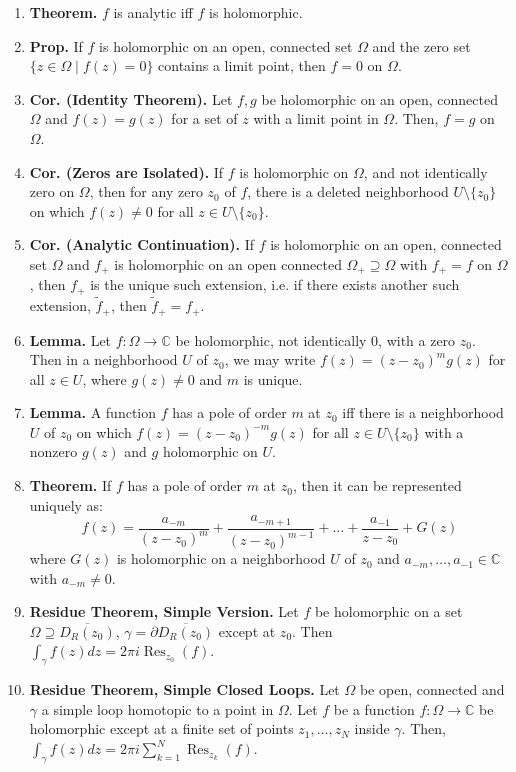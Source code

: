 \documentclass[10pt]{article}
\theoremstyle{definition}
\theoremstyle{named}
\DeclareMathOperator{\Res}{Res}
\begin{document}
\begin{enumerate}
    \item \textbf{Theorem. } $f$ is analytic iff $f$ is holomorphic. 
    \item \textbf{Prop. } If $f$ is holomorphic on an open, connected set $\Omega$ and the zero set $\{z \in \Omega \mid f(z) = 0\}$ contains a limit point, then $f=0$ on $\Omega$. 
    \item \textbf{Cor. (Identity Theorem). } Let $f,g$ be holomorphic on an open, connected $\Omega$ and $f(z)=g(z)$ for a set of $z$ with a limit point in $\Omega$. Then, $f=g$ on $\Omega$. 
    \item \textbf{Cor. (Zeros are Isolated). } If $f$ is holomorphic on $\Omega$, and not identically zero on $\Omega$, then for any zero $z_0$ of $f$, there is a deleted neighborhood $U \setminus \{z_0\}$ on which $f(z) \neq 0$ for all $z \in U \setminus \{z_0\}$. 
    \item \textbf{Cor. (Analytic Continuation). } If $f$ is holomorphic on an open, connected set $\Omega$ and $f_+$ is holomorphic on an open connected $\Omega_+ \supseteq \Omega$ with $f_+ = f$ on $\Omega$, then $f_+$ is the unique such extension, i.e. if there exists another such extension, $\tilde{f}_+$, then $\tilde{f}_+ = f_+$. 
    \item \textbf{Lemma. } Let $f: \Omega \to \mathbb{C}$ be holomorphic, not identically 0, with a zero $z_0$. Then in a neighborhood $U$ of $z_0$, we may write $f(z) = (z-z_0)^mg(z)$ for all $z \in U$, where $g(z) \neq 0$ and $m$ is unique. 
    \item \textbf{Lemma. } A function $f$ has a pole of order $m$ at $z_0$ iff there is a neighborhood $U$ of $z_0$ on which $f(z) = (z-z_0)^{-m}g(z)$ for all $z \in U \setminus \{z_0\}$ with a nonzero $g(z)$ and $g$ holomorphic on $U$. 
    \item \textbf{Theorem. } If $f$ has a pole of order $m$ at $z_0$, then it can be represented uniquely as: 
    $$
    f(z) = \frac{a_{-m}}{(z-z_0)^m} + \frac{a_{-m+1}}{(z-z_0)^{m-1}} + \dots + \frac{a_{-1}}{z-z_0} + G(z)
    $$ where $G(z)$ is holomorphic on a neighborhood $U$ of $z_0$ and $a_{-m}, \dots, a_{-1} \in \mathbb{C}$ with $a_{-m} \neq 0$. 
    \item \textbf{Residue Theorem, Simple Version. } Let $f$ be holomorphic on a set $\Omega \supseteq \overline{D_R(z_0)}$, $\gamma = \partial \overline{D_R(z_0)}$ except at $z_0$. Then $\int_\gamma f(z) dz = 2\pi i \Res_{z_0}(f)$. 
    \item \textbf{Residue Theorem, Simple Closed Loops. } Let $\Omega$ be open, connected and $\gamma$ a simple loop homotopic to a point in $\Omega$. Let $f$ be a function $f: \Omega \to \mathbb{C}$ be holomorphic except at a finite set of points $z_1, \dots, z_N$ inside $\gamma$. Then, $\int_\gamma f(z) dz = 2\pi i \sum_{k=1}^{N}\Res_{z_k}(f)$. 

\end{enumerate}
\end{document}
